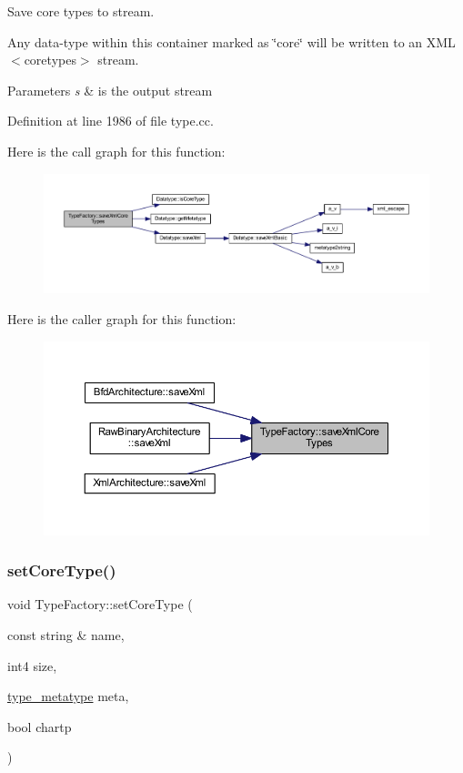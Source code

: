 Save core types to stream. 

Any data-\/type within this container marked as \char`\"{}core\char`\"{} will be written to an X\+ML $<$coretypes$>$ stream. 
\begin{DoxyParams}{Parameters}
{\em s} & is the output stream \\
\hline
\end{DoxyParams}


Definition at line 1986 of file type.\+cc.

Here is the call graph for this function\+:
\nopagebreak
\begin{figure}[H]
\begin{center}
\leavevmode
\includegraphics[width=350pt]{class_type_factory_a1caebbe3620eee3ba78427608b1126dd_cgraph}
\end{center}
\end{figure}
Here is the caller graph for this function\+:
\nopagebreak
\begin{figure}[H]
\begin{center}
\leavevmode
\includegraphics[width=350pt]{class_type_factory_a1caebbe3620eee3ba78427608b1126dd_icgraph}
\end{center}
\end{figure}
\mbox{\label{class_type_factory_a7f142a54450d41bc12ca18fe06c6e1e0}} 
\subsubsection{\texorpdfstring{setCoreType()}{setCoreType()}}
{\footnotesize\ttfamily void Type\+Factory\+::set\+Core\+Type (\begin{DoxyParamCaption}\item[{const string \&}]{name,  }\item[{int4}]{size,  }\item[{\mbox{\hyperlink{type_8hh_aef6429f2523cdf4d415ba04a0209e61f}{type\+\_\+metatype}}}]{meta,  }\item[{bool}]{chartp }\end{DoxyParamCaption})}



